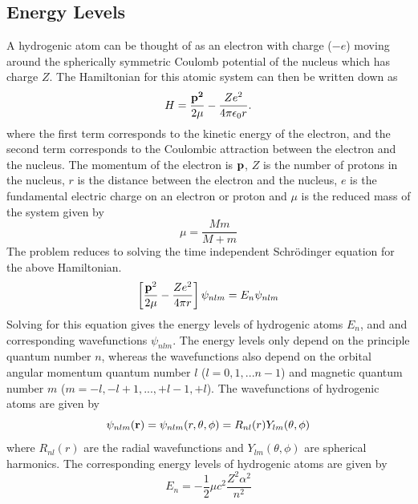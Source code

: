 \documentclass[a4paper]{serif}
\begin{document}
    \subsection{Energy Levels}
    A hydrogenic atom can be thought of as an electron with charge ($-e$) moving around
    the spherically symmetric Coulomb potential of the nucleus which has charge $Z$.
    The Hamiltonian for this atomic system can then be written down as
    \begin{displaymath}
        H = \frac{\bf{p}^2}{2\mu} - \frac{Ze^2}{4 \pi \epsilon_0 r}.
    \end{displaymath}
    where the first term corresponds to the kinetic energy of the electron, and
    the second term corresponds to the Coulombic attraction between the electron and 
    the nucleus. The momentum of the electron is $\bf{p}$, $Z$ is the number of protons
    in the nucleus, $r$ is the distance between the electron and the nucleus, $e$ is
    the fundamental electric charge on an electron or proton and $\mu$ is
    the reduced mass of the system given by
    \begin{displaymath}
        \mu = \frac{Mm}{M + m}
    \end{displaymath}
    The problem reduces to solving the time independent Schr\"odinger equation
    for the above Hamiltonian.
    \begin{displaymath}
    \left[ \frac{{\bf p}^2}{2\mu} - \frac{Ze^2}{4 \pi r}\right] \psi_{nlm} = E_n \psi_{nlm} 
    \end{displaymath}
    Solving for this equation gives the energy levels of hydrogenic atoms $E_n$, and 
    and corresponding wavefunctions $\psi_{nlm}$. The energy levels only depend on the
    principle quantum number $n$, whereas the wavefunctions also depend on the 
    orbital angular momentum quantum number $l$ ($l = 0, 1, ... n - 1$) and 
    magnetic quantum number $m$ ($m = -l, -l + 1, ... , +l - 1, +l$).
    The wavefunctions of hydrogenic atoms are given by
    \begin{displaymath}
        \psi_{nlm}({\bf r}) = \psi_{nlm}(r,\theta,\phi)
                           = R_{nl}(r) Y_{lm}(\theta, \phi)
    \end{displaymath}
    where $R_{nl}(r)$ are the radial wavefunctions and $Y_{lm}(\theta, \phi)$ are
    spherical harmonics. The corresponding energy levels of hydrogenic atoms are
    given by
    \begin{displaymath}
        E_n = - \frac{1}{2} \mu c^2 \frac{Z^2 \alpha^2}{n^2}
    \end{displaymath}
\end{document}
